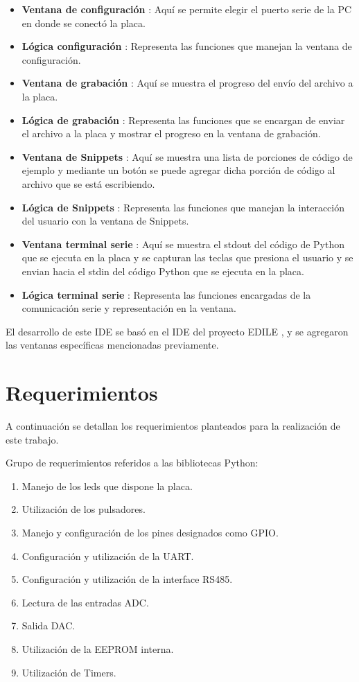 \begin{itemize}
	\item \textbf{Ventana de configuración} : Aquí se permite elegir el puerto serie de la PC en donde se conectó la placa.
	\item \textbf{Lógica configuración} : Representa las funciones que manejan la ventana de configuración.
	\item \textbf{Ventana de grabación} : Aquí se muestra el progreso del envío del archivo a la placa.
	\item \textbf{Lógica de grabación} : Representa las funciones que se encargan de enviar el archivo a la placa y mostrar el progreso en la ventana de grabación.
	\item \textbf{Ventana de Snippets} : Aquí se muestra una lista de porciones de código de ejemplo y mediante un botón se puede agregar dicha porción de código al archivo que se está escribiendo.
	\item \textbf{Lógica de Snippets} : Representa las funciones que manejan la interacción del usuario con la ventana de Snippets.
	\item \textbf{Ventana terminal serie} : Aquí se muestra el stdout del código de Python que se ejecuta en la placa y se capturan las teclas que presiona el usuario y se envian hacia el stdin del código Python que se ejecuta en la placa.
	\item \textbf{Lógica terminal serie} : Representa las funciones encargadas de la comunicación serie y representación en la ventana.
\end{itemize}
	
El desarrollo de este IDE se basó en el IDE del proyecto EDILE \cite{edile}, y se agregaron las ventanas específicas mencionadas previamente.







\section{Requerimientos}
\label{sec:req}

A continuación se detallan los requerimientos planteados para la realización de este trabajo.

Grupo de requerimientos referidos a las bibliotecas Python:
\begin{enumerate}
	\item  Manejo de los leds que dispone la placa.
	\item  Utilización de los pulsadores.
	\item  Manejo y configuración de los pines designados como GPIO. 
	\item  Configuración y utilización de la UART.
	\item  Configuración y utilización de la interface RS485.
	\item  Lectura de las entradas ADC.
	\item  Salida DAC.
	\item  Utilización de la EEPROM interna.
	\item  Utilización de Timers.
\end{enumerate}

